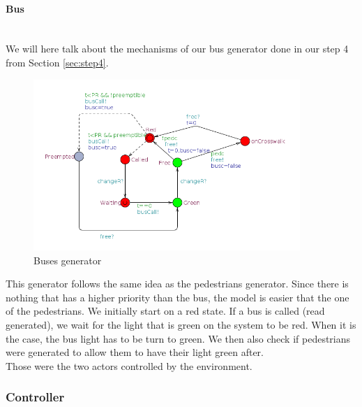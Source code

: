 \paragraph{Bus} \mbox{}\\
We will here talk about the mechanisms of our bus generator done in our step 4 from Section \ref{sec:step4}. \\

\begin{figure}[!ht]\label{fig:bus}
  \centering
    \includegraphics[width=0.9\textwidth]{picture/bus.png}
    \caption{Buses generator}
\end{figure}

\noindent This generator follows the same idea as the pedestrians generator. Since there is nothing that has a higher priority than the bus, the model is easier that the one of the pedestrians. We initially start on a red state. If a bus is called (read generated), we wait for the light that is green on the system to be red. When it is the case, the bus light has to be turn to green. We then also check if pedestrians were generated to allow them to have their light green after. \\

Those were the two actors controlled by the environment.

\subsubsection{Controller}

